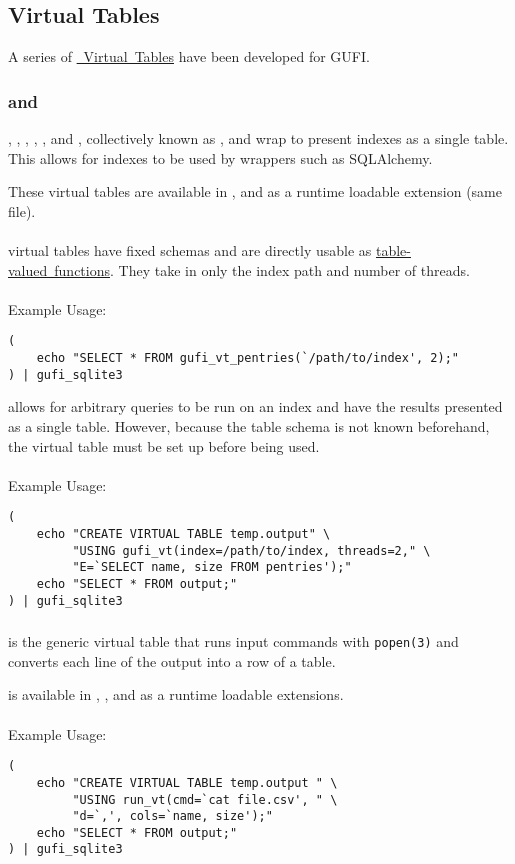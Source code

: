 \subsection{Virtual Tables}
A series of
\href{https://www.sqlite.org/vtab.html}{\sqlite~Virtual~Tables} have
been developed for GUFI.

\subsubsection{\gufivtstar and \gufivt}
\gufivttreesummary, \gufivtsummary, \gufivtentries, \gufivtpentries,
\gufivtvrsummary, and \gufivtvrpentries, collectively known as
\gufivtstar, and \gufivt wrap \gufiquery to present indexes as a
single \sqlite table. This allows for indexes to be used by \sqlite
wrappers such as SQLAlchemy.

These virtual tables are available in \gufisqlite, and as a runtime
loadable extension (same file).
\\\\
\indent \gufivtstar virtual tables have fixed schemas and are directly usable
as
\href{https://www.sqlite.org/vtab.html#tabfunc2}{table-valued~functions}. They
take in only the index path and number of threads.
\\\\
Example Usage:
\begin{verbatim}
(
    echo "SELECT * FROM gufi_vt_pentries(`/path/to/index', 2);"
) | gufi_sqlite3
\end{verbatim}

\indent \gufivt allows for arbitrary queries to be run on an index and have
the results presented as a single table. However, because the table
schema is not known beforehand, the virtual table must be set up
before being used.
\\\\
Example Usage:
\begin{verbatim}
(
    echo "CREATE VIRTUAL TABLE temp.output" \
         "USING gufi_vt(index=/path/to/index, threads=2," \
         "E=`SELECT name, size FROM pentries');"
    echo "SELECT * FROM output;"
) | gufi_sqlite3
\end{verbatim}

\subsubsection{\runvt}
\runvt is the generic virtual table that runs input commands with
\texttt{popen(3)} and converts each line of the output into a row of a
\sqlite table.

\runvt is available in \gufiquery, \gufisqlite, and as a runtime
loadable extensions.
\\\\
Example Usage:
\begin{verbatim}
(
    echo "CREATE VIRTUAL TABLE temp.output " \
         "USING run_vt(cmd=`cat file.csv', " \
         "d=`,', cols=`name, size');"
    echo "SELECT * FROM output;"
) | gufi_sqlite3
\end{verbatim} 
